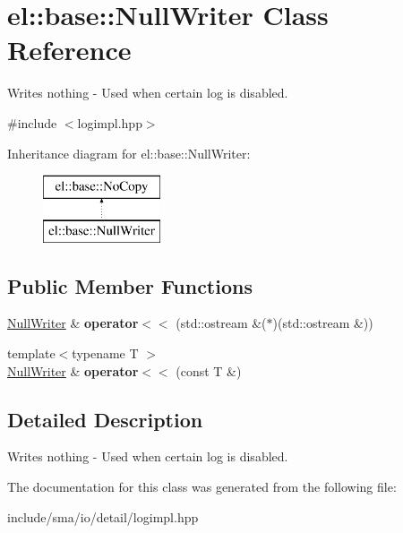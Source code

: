 \hypertarget{classel_1_1base_1_1NullWriter}{\section{el\-:\-:base\-:\-:Null\-Writer Class Reference}
\label{classel_1_1base_1_1NullWriter}
}


Writes nothing -\/ Used when certain log is disabled.  




{\ttfamily \#include $<$logimpl.\-hpp$>$}

Inheritance diagram for el\-:\-:base\-:\-:Null\-Writer\-:\begin{figure}[H]
\begin{center}
\leavevmode
\includegraphics[height=2.000000cm]{classel_1_1base_1_1NullWriter}
\end{center}
\end{figure}
\subsection*{Public Member Functions}
\begin{DoxyCompactItemize}
\item 
\hypertarget{classel_1_1base_1_1NullWriter_a39cb7d47986d70c2b4e9d78d1482da7d}{\hyperlink{classel_1_1base_1_1NullWriter}{Null\-Writer} \& {\bfseries operator$<$$<$} (std\-::ostream \&($\ast$)(std\-::ostream \&))}\label{classel_1_1base_1_1NullWriter_a39cb7d47986d70c2b4e9d78d1482da7d}

\item 
\hypertarget{classel_1_1base_1_1NullWriter_a57cb0f5d93ebac076b8ef94d6eff65a2}{{\footnotesize template$<$typename T $>$ }\\\hyperlink{classel_1_1base_1_1NullWriter}{Null\-Writer} \& {\bfseries operator$<$$<$} (const T \&)}\label{classel_1_1base_1_1NullWriter_a57cb0f5d93ebac076b8ef94d6eff65a2}

\end{DoxyCompactItemize}


\subsection{Detailed Description}
Writes nothing -\/ Used when certain log is disabled. 

The documentation for this class was generated from the following file\-:\begin{DoxyCompactItemize}
\item 
include/sma/io/detail/logimpl.\-hpp\end{DoxyCompactItemize}
